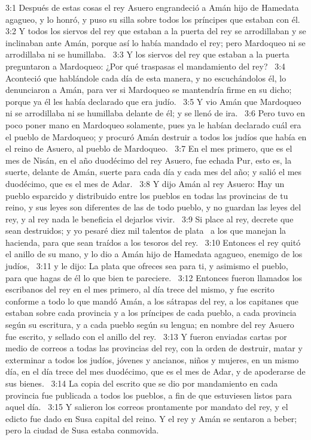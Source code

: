 3:1 Después de estas cosas el rey Asuero engrandeció a Amán hijo de Hamedata agagueo, y lo honró, y puso su silla sobre todos los príncipes que estaban con él.  
3:2 Y todos los siervos del rey que estaban a la puerta del rey se arrodillaban y se inclinaban ante Amán, porque así lo había mandado el rey; pero Mardoqueo ni se arrodillaba ni se humillaba.  
3:3 Y los siervos del rey que estaban a la puerta preguntaron a Mardoqueo: ¿Por qué traspasas el mandamiento del rey?  
3:4 Aconteció que hablándole cada día de esta manera, y no escuchándolos él, lo denunciaron a Amán, para ver si Mardoqueo se mantendría firme en su dicho; porque ya él les había declarado que era judío.  
3:5 Y vio Amán que Mardoqueo ni se arrodillaba ni se humillaba delante de él; y se llenó de ira.  
3:6 Pero tuvo en poco poner mano en Mardoqueo solamente, pues ya le habían declarado cuál era el pueblo de Mardoqueo; y procuró Amán destruir a todos los judíos que había en el reino de Asuero, al pueblo de Mardoqueo.  
3:7 En el mes primero, que es el mes de Nisán, en el año duodécimo del rey Asuero, fue echada Pur, esto es, la suerte, delante de Amán, suerte para cada día y cada mes del año; y salió el mes duodécimo, que es el mes de Adar.  
3:8 Y dijo Amán al rey Asuero: Hay un pueblo esparcido y distribuido entre los pueblos en todas las provincias de tu reino, y sus leyes son diferentes de las de todo pueblo, y no guardan las leyes del rey, y al rey nada le beneficia el dejarlos vivir.  
3:9 Si place al rey, decrete que sean destruidos; y yo pesaré diez mil talentos de plata  a los que manejan la hacienda, para que sean traídos a los tesoros del rey.  
3:10 Entonces el rey quitó el anillo de su mano, y lo dio a Amán hijo de Hamedata agagueo, enemigo de los judíos,  
3:11 y le dijo: La plata que ofreces sea para ti, y asimismo el pueblo, para que hagas de él lo que bien te pareciere.  
3:12 Entonces fueron llamados los escribanos del rey en el mes primero, al día trece del mismo, y fue escrito conforme a todo lo que mandó Amán, a los sátrapas del rey, a los capitanes que estaban sobre cada provincia y a los príncipes de cada pueblo, a cada provincia según su escritura, y a cada pueblo según su lengua; en nombre del rey Asuero fue escrito, y sellado con el anillo del rey.  
3:13 Y fueron enviadas cartas por medio de correos a todas las provincias del rey, con la orden de destruir, matar y exterminar a todos los judíos, jóvenes y ancianos, niños y mujeres, en un mismo día, en el día trece del mes duodécimo, que es el mes de Adar, y de apoderarse de sus bienes.  
3:14 La copia del escrito que se dio por mandamiento en cada provincia fue publicada a todos los pueblos, a fin de que estuviesen listos para aquel día.  
3:15 Y salieron los correos prontamente por mandato del rey, y el edicto fue dado en Susa capital del reino. Y el rey y Amán se sentaron a beber; pero la ciudad de Susa estaba conmovida.  
